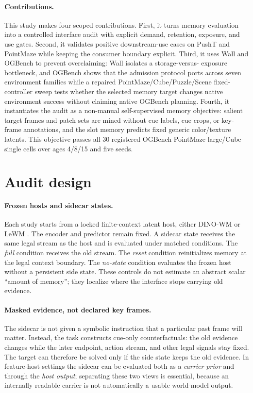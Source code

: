 \paragraph{Contributions.}
This study makes four scoped contributions.  First, it turns memory
evaluation into a controlled interface audit with explicit demand, retention,
exposure, and use gates.  Second, it validates positive downstream-use cases on
PushT and PointMaze while keeping the consumer boundary explicit.  Third, it
uses Wall and OGBench to prevent overclaiming: Wall isolates a storage-versus-
exposure bottleneck, and OGBench shows that the admission protocol ports across
seven environment families while a repaired PointMaze/Cube/Puzzle/Scene
fixed-controller sweep tests whether the selected memory target changes native
environment success without claiming native OGBench planning.  Fourth, it
instantiates the audit as a
non-manual self-supervised memory objective: salient target frames and patch
sets are mined without cue labels, cue crops, or key-frame annotations, and the
slot memory predicts fixed generic color/texture latents.  This objective
passes all 30 registered OGBench PointMaze-large/Cube-single cells over ages
4/8/15 and five seeds.

\section{Audit design}

\paragraph{Frozen hosts and sidecar states.}
Each study starts from a locked finite-context latent host, either DINO-WM
\citep{r_dinowm} or LeWM \citep{r_lewm}.  The encoder and predictor remain
fixed.  A sidecar state receives the same legal stream as the host and is
evaluated under matched conditions.  The \emph{full} condition receives the old
stream.  The \emph{reset} condition reinitializes memory at the legal context
boundary.  The \emph{no-state} condition evaluates the frozen host without a
persistent side state.  These controls do not estimate an abstract scalar
``amount of memory''; they localize where the interface stops carrying old
evidence.

\paragraph{Masked evidence, not declared key frames.}
The sidecar is not given a symbolic instruction that a particular past frame
will matter.  Instead, the task constructs cue-only counterfactuals: the old
evidence changes while the later endpoint, action stream, and other legal
signals stay fixed.  The target can therefore be solved only if the side state
keeps the old evidence.  In feature-host settings the sidecar can be evaluated
both as a \emph{carrier prior} and through the \emph{host output}; separating
these two views is essential, because an internally readable carrier is not
automatically a usable world-model output.

